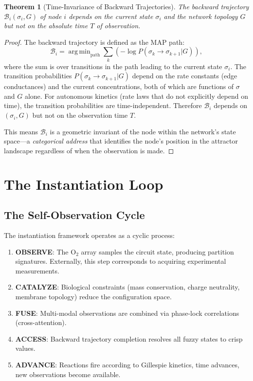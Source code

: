 \documentclass[twocolumn,10pt,a4paper]{article}
\newtheorem{theorem}{Theorem}[section]
\theoremstyle{definition}
\theoremstyle{remark}
\newcommand{\Back}{\mathcal{B}}
\DeclareMathOperator*{\argmin}{arg\,min}
\begin{document}
\begin{theorem}[Time-Invariance of Backward Trajectories]
\label{thm:time_invariance}
The backward trajectory $\Back_i(\sigma_i, G)$ of node $i$ depends on the current state $\sigma_i$ and the network topology $G$ but not on the absolute time $T$ of observation.
\end{theorem}

\begin{proof}
The backward trajectory is defined as the MAP path:
\begin{equation}
    \Back_i = \argmin_{\text{path}} \sum_{k} (-\log P(\sigma_k \to \sigma_{k+1} | G)),
\end{equation}
where the sum is over transitions in the path leading to the current state $\sigma_i$. The transition probabilities $P(\sigma_k \to \sigma_{k+1} | G)$ depend on the rate constants (edge conductances) and the current concentrations, both of which are functions of $\sigma$ and $G$ alone. For autonomous kinetics (rate laws that do not explicitly depend on time), the transition probabilities are time-independent. Therefore $\Back_i$ depends on $(\sigma_i, G)$ but not on the observation time $T$.

This means $\Back_i$ is a geometric invariant of the node within the network's state space---a \emph{categorical address} that identifies the node's position in the attractor landscape regardless of when the observation is made.
\end{proof}

\section{The Instantiation Loop}
\label{sec:loop}

\subsection{The Self-Observation Cycle}

The instantiation framework operates as a cyclic process:

\begin{enumerate}[nosep]
    \item \textbf{OBSERVE}: The O$_2$ array samples the circuit state, producing partition signatures. Externally, this step corresponds to acquiring experimental measurements.
    \item \textbf{CATALYZE}: Biological constraints (mass conservation, charge neutrality, membrane topology) reduce the configuration space.
    \item \textbf{FUSE}: Multi-modal observations are combined via phase-lock correlations (cross-attention).
    \item \textbf{ACCESS}: Backward trajectory completion resolves all fuzzy states to crisp values.
    \item \textbf{ADVANCE}: Reactions fire according to Gillespie kinetics, time advances, new observations become available.
\end{enumerate}
\end{document}
